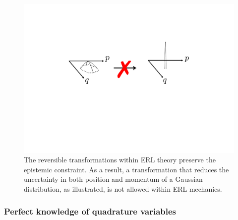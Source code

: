 \documentclass[pra,superscriptaddress,nofootinbib,12pt]{revtex4-2}
\newtheorem{lemma}[theorem]{Lemma}
\newenvironment{proof}[1][Proof]{\noindent\textbf{#1.} }{\ \rule{0.5em}{0.5em}}
\begin{document}
\begin{figure}
\begin{center}
\includegraphics[width=1\hsize]{NoDecrease}
\caption{The reversible transformations within ERL theory preserve the epistemic constraint.  As a result, a transformation that reduces the uncertainty in both position and momentum of a Gaussian distribution, as illustrated, is not allowed within ERL mechanics.}\label{fig:NoDecrease}
\end{center}
\end{figure}




\subsubsection{Perfect knowledge of quadrature variables}
\end{document}
